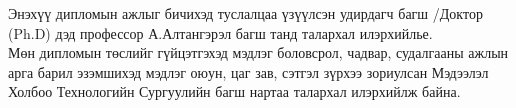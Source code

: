

\begin{acknowledgements}
\addchaptertocentry{\acknowledgementname}

Энэхүү дипломын ажлыг бичихэд туслалцаа үзүүлсэн удирдагч багш /Доктор (Ph.D) дэд профессор А.Алтангэрэл багш танд талархал илэрхийлье.\\

Мөн дипломын төслийг гүйцэтгэхэд мэдлэг боловсрол, чадвар, судалгааны ажлын арга барил эзэмшихэд мэдлэг оюун, цаг зав, сэтгэл зүрхээ зориулсан Мэдээлэл Холбоо Технологийн Сургуулийн багш нартаа талархал илэрхийлж байна.



\end{acknowledgements}

